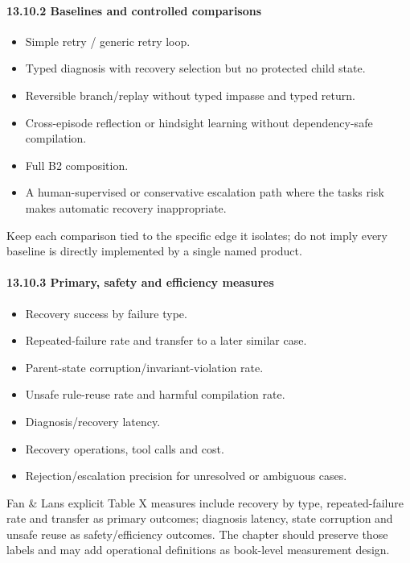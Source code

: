\paragraph{13.10.2 Baselines and controlled comparisons}\label{13102-baselines-and-controlled-comparisons}

\begin{itemize}
\tightlist
\item
  Simple retry / generic retry loop.
\item
  Typed diagnosis with recovery selection but no protected child state.
\item
  Reversible branch/replay without typed impasse and typed return.
\item
  Cross-episode reflection or hindsight learning without dependency-safe compilation.
\item
  Full B2 composition.
\item
  A human-supervised or conservative escalation path where the task\textquotesingle s risk makes automatic recovery inappropriate.
\end{itemize}

Keep each comparison tied to the specific edge it isolates; do not imply every baseline is directly implemented by a single named product.

\paragraph{13.10.3 Primary, safety and efficiency measures}\label{13103-primary-safety-and-efficiency-measures}

\begin{itemize}
\tightlist
\item
  Recovery success by failure type.
\item
  Repeated-failure rate and transfer to a later similar case.
\item
  Parent-state corruption/invariant-violation rate.
\item
  Unsafe rule-reuse rate and harmful compilation rate.
\item
  Diagnosis/recovery latency.
\item
  Recovery operations, tool calls and cost.
\item
  Rejection/escalation precision for unresolved or ambiguous cases.
\end{itemize}

Fan \& Lan\textquotesingle s explicit Table X measures include recovery by type, repeated-failure rate and transfer as primary outcomes; diagnosis latency, state corruption and unsafe reuse as safety/efficiency outcomes. The chapter should preserve those labels and may add operational definitions as book-level measurement design.

